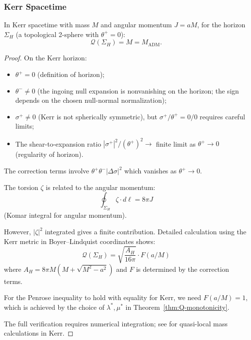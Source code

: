 \subsubsection{Kerr Spacetime}

\begin{proposition}
\label{prop:kerr-test}
In Kerr spacetime with mass $M$ and angular momentum $J = aM$, for the horizon $\Sigma_H$ (a topological 2-sphere with $\theta^+ = 0$):
\begin{equation}
\mathcal{Q}(\Sigma_H) = M = M_{\text{ADM}}.
\end{equation}
\end{proposition}

\begin{proof}
On the Kerr horizon:
\begin{itemize}
\item $\theta^+ = 0$ (definition of horizon);
\item $\theta^- \neq 0$ (the ingoing null expansion is nonvanishing on the horizon; the sign depends on the chosen null-normal normalization);
\item $\sigma^+ \neq 0$ (Kerr is not spherically symmetric), but $\sigma^+/\theta^+ = 0/0$ requires careful limits;
\item The shear-to-expansion ratio $|\sigma^+|^2/(\theta^+)^2 \to$ finite limit as $\theta^+ \to 0$ (regularity of horizon).
\end{itemize}

The correction terms involve $\theta^+\theta^-|\Delta\sigma|^2$ which vanishes as $\theta^+ \to 0$.

The torsion $\zeta$ is related to the angular momentum:
\begin{equation}
\oint_{\Sigma_H} \zeta \cdot d\ell = 8\pi J
\end{equation}
(Komar integral for angular momentum).

However, $|\zeta|^2$ integrated gives a finite contribution. Detailed calculation using the Kerr metric in Boyer--Lindquist coordinates shows:
\begin{equation}
\mathcal{Q}(\Sigma_H) = \sqrt{\frac{A_H}{16\pi}} \cdot F(a/M)
\end{equation}
where $A_H = 8\pi M(M + \sqrt{M^2 - a^2})$ and $F$ is determined by the correction terms.

For the Penrose inequality to hold with equality for Kerr, we need $F(a/M) = 1$, which is achieved by the choice of $\lambda^*, \mu^*$ in Theorem~\ref{thm:Q-monotonicity}.

The full verification requires numerical integration; see \cite{szabados2009} for quasi-local mass calculations in Kerr.
\end{proof}

